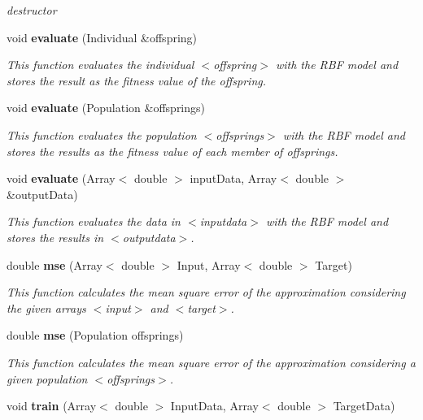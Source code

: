 \begin{CompactItemize}
\begin{CompactList}\small\item\em destructor \item\end{CompactList}\item 
void {\bf evaluate} (Individual \&offspring)
\begin{CompactList}\small\item\em This function evaluates the individual $<$offspring$>$ with the RBF model and stores the result as the fitness value of the offspring. \item\end{CompactList}\item 
void {\bf evaluate} (Population \&offsprings)
\begin{CompactList}\small\item\em This function evaluates the population $<$offsprings$>$ with the RBF model and stores the results as the fitness value of each member of offsprings. \item\end{CompactList}\item 
void {\bf evaluate} (Array$<$ double $>$ input\-Data, Array$<$ double $>$ \&output\-Data)
\begin{CompactList}\small\item\em This function evaluates the data in $<$inputdata$>$ with the RBF model and stores the results in $<$outputdata$>$. \item\end{CompactList}\item 
double {\bf mse} (Array$<$ double $>$ Input, Array$<$ double $>$ Target)
\begin{CompactList}\small\item\em This function calculates the mean square error of the approximation considering the given arrays $<$input$>$ and $<$target$>$. \item\end{CompactList}\item 
double {\bf mse} (Population offsprings)
\begin{CompactList}\small\item\em This function calculates the mean square error of the approximation considering a given population $<$offsprings$>$. \item\end{CompactList}\item 
void {\bf train} (Array$<$ double $>$ Input\-Data, Array$<$ double $>$ Target\-Data)

\end{CompactItemize}
